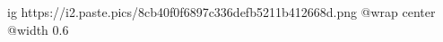  
 
 
 
 

\ifcmt
	ig https://i2.paste.pics/8cb40f0f6897c336defb5211b412668d.png
  @wrap center
  @width 0.6
\fi

